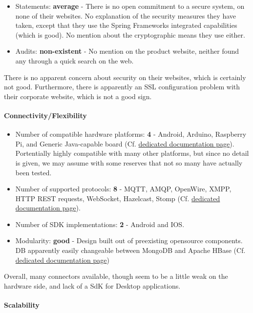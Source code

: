 \documentclass{article}
\begin{document}
\begin{itemize}
\item Statements: \textbf{average} - There is no open commitment to a secure system, on none of their websites. No explanation of the security measures they have taken, except that they use the Spring Frameworks integrated capabilities (which is good). No mention about the cryptographic means they use either.
\item Audits: \textbf{non-existent} - No mention on the product website, neither found any through a quick search on the web.
\end{itemize}

There is no apparent concern about security on their websites, which is certainly not good. Furthermore, there is apparently an SSL configuration problem with their corporate website, which is not a good sign.

\paragraph{Connectivity/Flexibility}

\begin{itemize}
\item Number of compatible hardware platforms: \textbf{4} - Android, Arduino, Raspberry Pi, and Generic Java-capable board (Cf. \href{http://documentation.sitewhere.io/integration.html}{dedicated documentation page}). Portentially highly compatible with many other platforms, but since no detail is given, we may assume with some reserves that not so many have actually been tested.
\item Number of supported protocols: \textbf{8} - MQTT, AMQP, OpenWire, XMPP, HTTP REST requests, WebSocket, Hazelcast, Stomp (Cf. \href{http://documentation.sitewhere.io/userguide/tenant/device-communication.html}{dedicated documentation page}).
\item Number of SDK implementations: \textbf{2} - Android and IOS.
\item Modularity: \textbf{good} - Design built out of preexisting opensource components. DB apparently easily changeable between MongoDB and Apache HBase (Cf. \href{http://documentation.sitewhere.io/architecture.html}{dedicated documentation page})
\end{itemize}

Overall, many connectors available, though seem to be a little weak on the hardware side, and lack of a SdK for Desktop applications.

\paragraph{Scalability}
\end{document}
